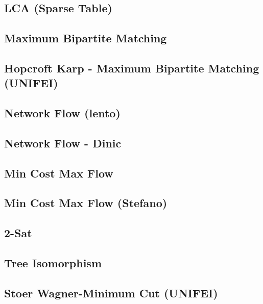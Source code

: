 \subsection{LCA (Sparse Table)}
\raggedbottom
\hrulefill
\subsection{Maximum Bipartite Matching}
\raggedbottom
\hrulefill
\subsection{Hopcroft Karp - Maximum Bipartite Matching (UNIFEI)}
\raggedbottom
\hrulefill
\subsection{Network Flow (lento)}
\raggedbottom
\hrulefill
\subsection{Network Flow - Dinic}
\raggedbottom
\hrulefill
\subsection{Min Cost Max Flow}
\raggedbottom
\hrulefill
\subsection{Min Cost Max Flow (Stefano)}
\raggedbottom
\hrulefill
\subsection{2-Sat}
\raggedbottom
\hrulefill
\subsection{Tree Isomorphism}
\raggedbottom
\hrulefill
\subsection{Stoer Wagner-Minimum Cut (UNIFEI)}
\raggedbottom
\hrulefill
